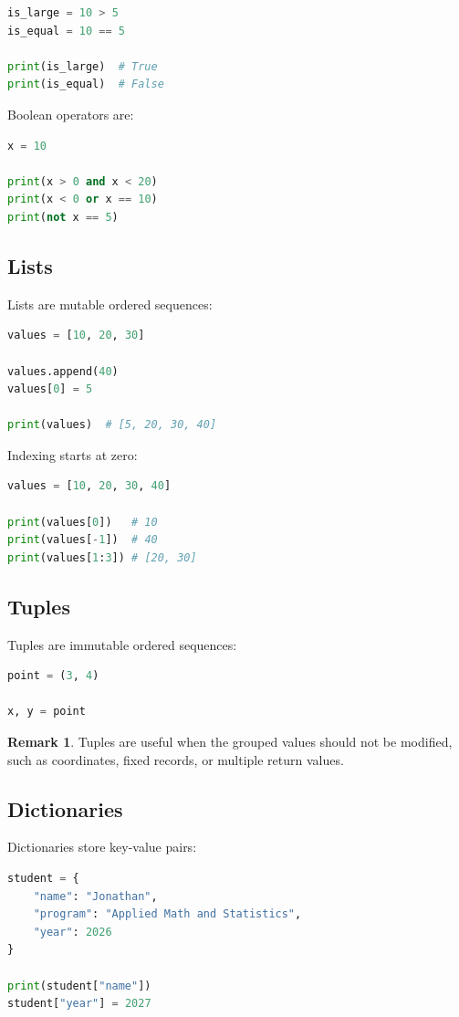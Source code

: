 \documentclass[12pt,oneside]{book}
\numberwithin{equation}{section}
\theoremstyle{definition}
\newtheorem{remark}{Remark}[section]
\theoremstyle{plain}
\theoremstyle{remark}
\begin{document}
\begin{lstlisting}[language=Python]
is_large = 10 > 5
is_equal = 10 == 5

print(is_large)  # True
print(is_equal)  # False
\end{lstlisting}

Boolean operators are:
\begin{lstlisting}[language=Python]
x = 10

print(x > 0 and x < 20)
print(x < 0 or x == 10)
print(not x == 5)
\end{lstlisting}

\subsection{Lists}

Lists are mutable ordered sequences:
\begin{lstlisting}[language=Python]
values = [10, 20, 30]

values.append(40)
values[0] = 5

print(values)  # [5, 20, 30, 40]
\end{lstlisting}

Indexing starts at zero:
\begin{lstlisting}[language=Python]
values = [10, 20, 30, 40]

print(values[0])   # 10
print(values[-1])  # 40
print(values[1:3]) # [20, 30]
\end{lstlisting}

\subsection{Tuples}

Tuples are immutable ordered sequences:
\begin{lstlisting}[language=Python]
point = (3, 4)

x, y = point
\end{lstlisting}

\begin{remark}
Tuples are useful when the grouped values should not be modified, such as coordinates, fixed records, or multiple return values.
\end{remark}

\subsection{Dictionaries}

Dictionaries store key-value pairs:
\begin{lstlisting}[language=Python]
student = {
    "name": "Jonathan",
    "program": "Applied Math and Statistics",
    "year": 2026
}

print(student["name"])
student["year"] = 2027
\end{lstlisting}
\end{document}
